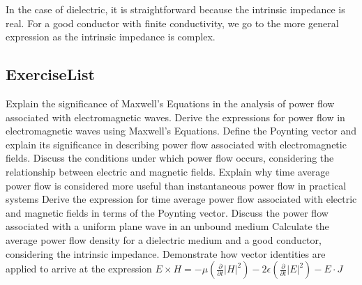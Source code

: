 In the case of dielectric, it is straightforward because the intrinsic impedance is real. For a good conductor with finite conductivity, we go to the more general expression as the intrinsic impedance is complex.
\begin{mdframed}[backgroundcolor=lightblue, linewidth=1pt,  hidealllines=true]
\section{ExerciseList}
\begin{ExerciseList}
	\Exercise[label={ex11}] Explain the significance of Maxwell's Equations in the analysis of power flow associated with electromagnetic waves.
	\Exercise[label={ex11}] Derive the expressions for power flow in electromagnetic waves using Maxwell's Equations.
    \Exercise[label={ex11}] Define the Poynting vector and explain its significance in describing power flow associated with electromagnetic fields.
	\Exercise[label={ex11}] Discuss the conditions under which power flow occurs, considering the relationship between electric and magnetic fields.
	\Exercise[label={ex11}] Explain why time average power flow is considered more useful than instantaneous power flow in practical systems
	\Exercise[label={ex11}] Derive the expression for time average power flow associated with electric and magnetic fields in terms of the Poynting vector.
	\Exercise[label={ex11}] Discuss the power flow associated with a uniform plane wave in an unbound medium
	\Exercise[label={ex11}] Calculate the average power flow density for a dielectric medium and a good conductor, considering the intrinsic impedance.
	\Exercise[label={ex11}] Demonstrate how vector identities are applied to arrive at the expression 
	\(E \times H = -\mu\left(\frac{\partial}{\partial t} \lvert H \rvert^2\right) - 2\epsilon\left(\frac{\partial}{\partial t} \lvert E \rvert^2\right) - E \cdot J\)
	
	
\end{ExerciseList}
\end{mdframed}

